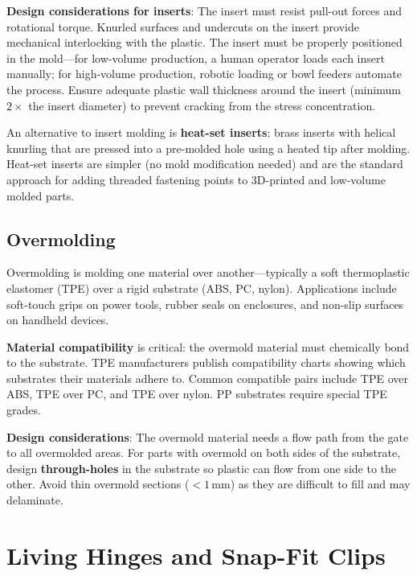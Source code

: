 \documentclass[11pt,letterpaper,twoside,openany]{book}
\begin{document}
\textbf{Design considerations for inserts}: The insert must resist pull-out forces and rotational torque. Knurled surfaces and undercuts on the insert provide mechanical interlocking with the plastic. The insert must be properly positioned in the mold---for low-volume production, a human operator loads each insert manually; for high-volume production, robotic loading or bowl feeders automate the process. Ensure adequate plastic wall thickness around the insert (minimum $2\times$ the insert diameter) to prevent cracking from the stress concentration.

An alternative to insert molding is \textbf{heat-set inserts}: brass inserts with helical knurling that are pressed into a pre-molded hole using a heated tip after molding. Heat-set inserts are simpler (no mold modification needed) and are the standard approach for adding threaded fastening points to 3D-printed and low-volume molded parts.

\subsection{Overmolding}
Overmolding is molding one material over another---typically a soft thermoplastic elastomer (TPE) over a rigid substrate (ABS, PC, nylon). Applications include soft-touch grips on power tools, rubber seals on enclosures, and non-slip surfaces on handheld devices.

\textbf{Material compatibility} is critical: the overmold material must chemically bond to the substrate. TPE manufacturers publish compatibility charts showing which substrates their materials adhere to. Common compatible pairs include TPE over ABS, TPE over PC, and TPE over nylon. PP substrates require special TPE grades.

\textbf{Design considerations}: The overmold material needs a flow path from the gate to all overmolded areas. For parts with overmold on both sides of the substrate, design \textbf{through-holes} in the substrate so plastic can flow from one side to the other. Avoid thin overmold sections ($< 1$\,mm) as they are difficult to fill and may delaminate.

\FloatBarrier
\section{Living Hinges and Snap-Fit Clips}
\label{sec:hinges}
\end{document}
